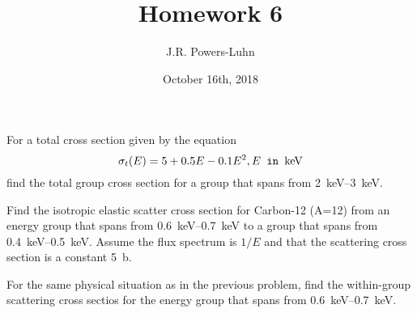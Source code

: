 \documentclass{hw}
\title{Homework 6}
\author{J.R. Powers-Luhn}
\date{October 16th, 2018}
\begin{document}
\problem{}
For a total cross section given by the equation $$\sigma_t(E) = 5 + 0.5E - 0.1 E^2, E\texttt{ in \si{\kilo\electronvolt}}$$ find the total group cross section for a group that spans from \SIrange{2}{3}{\kilo\electronvolt}.

\solution


\problem{}
Find the isotropic elastic scatter cross section for Carbon-12 (A=12) from an energy group that spans from \SIrange{0.6}{0.7}{\kilo\electronvolt} to a group that spans from \SIrange{0.4}{0.5}{\kilo\electronvolt}. Assume the flux spectrum is $1/E$ and that the scattering cross section is a constant \SI{5}{\barn}.

\solution

\problem{}
For the same physical situation as in the previous problem, find the within-group scattering cross sectios for the energy group that spans from \SIrange{0.6}{0.7}{\kilo\electronvolt}.

\solution
\end{document}
